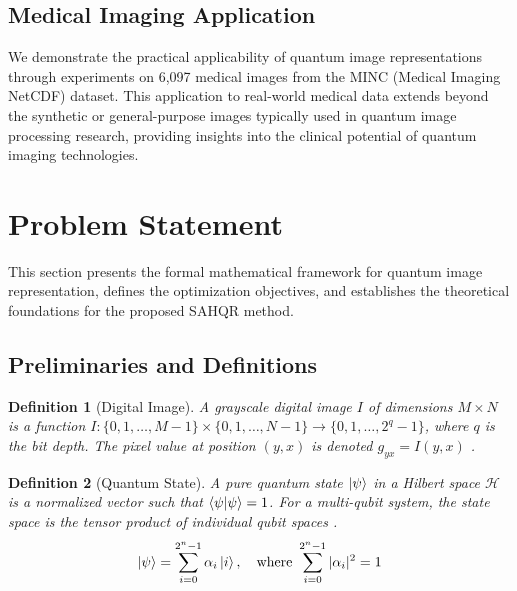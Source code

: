 \documentclass[pdflatex,sn-mathphys-num,Numbered]{sn-jnl}
\theoremstyle{thmstyleone}
\theoremstyle{thmstyletwo}
\theoremstyle{thmstylethree}
\newtheorem{definition}{Definition}
\begin{document}
\subsection{Medical Imaging Application}

We demonstrate the practical applicability of quantum image representations through experiments on 6,097 medical images from the MINC (Medical Imaging NetCDF) dataset. This application to real-world medical data extends beyond the synthetic or general-purpose images typically used in quantum image processing research, providing insights into the clinical potential of quantum imaging technologies.


\section{Problem Statement}\label{sec:problem}

This section presents the formal mathematical framework for quantum image representation, defines the optimization objectives, and establishes the theoretical foundations for the proposed SAHQR method.

\subsection{Preliminaries and Definitions}

\begin{definition}[Digital Image]
A grayscale digital image $I$ of dimensions $M \times N$ is a function $I: \{0, 1, \ldots, M-1\} \times \{0, 1, \ldots, N-1\} \rightarrow \{0, 1, \ldots, 2^q - 1\}$, where $q$ is the bit depth. The pixel value at position $(y, x)$ is denoted $g_{yx} = I(y, x)$ \cite{bib62}.
\end{definition}

\begin{definition}[Quantum State]
A pure quantum state $\ket{\psi}$ in a Hilbert space $\mathcal{H}$ is a normalized vector such that $\braket{\psi|\psi} = 1$. For a multi-qubit system, the state space is the tensor product of individual qubit spaces \cite{bib63}.
\begin{equation}
\ket{\psi} = \sum_{i=0}^{2^n - 1} \alpha_i \ket{i}, \quad \text{where } \sum_{i=0}^{2^n - 1} |\alpha_i|^2 = 1
\label{eq:quantum_state}
\end{equation}
\end{definition}
\end{document}
